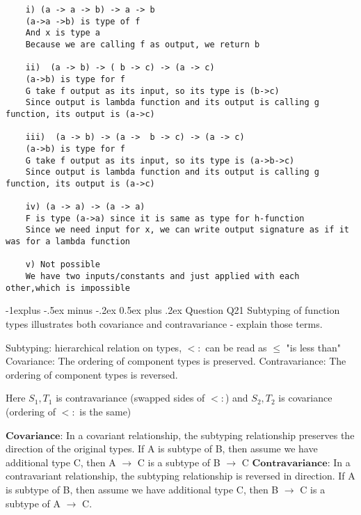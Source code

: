 \documentclass[letterpaper, 8pt]{extarticle}
\makeatletter
\renewcommand{\subsection}{\@startsection{subsection}{2}{0mm}%
                                {-1explus -.5ex minus -.2ex}%
                                {0.5ex plus .2ex}%
                                {\normalfont\small\bfseries}}
\makeatother
\begin{document}
\begin{multicols*}{4}
\begin{lstlisting}
    i) (a -> a -> b) -> a -> b
    (a->a ->b) is type of f
    And x is type a
    Because we are calling f as output, we return b

    ii)  (a -> b) -> ( b -> c) -> (a -> c)
    (a->b) is type for f
    G take f output as its input, so its type is (b->c)
    Since output is lambda function and its output is calling g function, its output is (a->c)

    iii)  (a -> b) -> (a ->  b -> c) -> (a -> c)
    (a->b) is type for f
    G take f output as its input, so its type is (a->b->c)
    Since output is lambda function and its output is calling g function, its output is (a->c)

    iv) (a -> a) -> (a -> a)
    F is type (a->a) since it is same as type for h-function
    Since we need input for x, we can write output signature as if it was for a lambda function

    v) Not possible
    We have two inputs/constants and just applied with each other,which is impossible
    \end{lstlisting}


    \subsection{Question Q21}
    Subtyping of function types illustrates both covariance and contravariance - explain those terms.

    Subtyping: hierarchical relation on types, $<:$ can be read as $\leq$ "is less than"\\
    Covariance: The ordering of component types is preserved.
    Contravariance: The ordering of component types is reversed.\\
    \begin{mathpar}
    \end{mathpar}
    Here $S_1, T_1$ is contravariance (swapped sides of $<:$) and $S_2, T_2$ is covariance
    (ordering of $<:$ is the same)

    $\textbf{Covariance:}$
    In a covariant relationship, the subtyping relationship preserves the direction of the original
    types.
    If A is subtype of B, then assume we have additional type C, then A $\to$ C is a subtype of B $\to$ C
    $\textbf{Contravariance:}$
    In a contravariant relationship, the subtyping relationship is reversed in direction.
    If A is subtype of B, then assume we have additional type C, then B $\to$ C is a subtype of A $\to$ C.


\end{multicols*}
\end{document}
